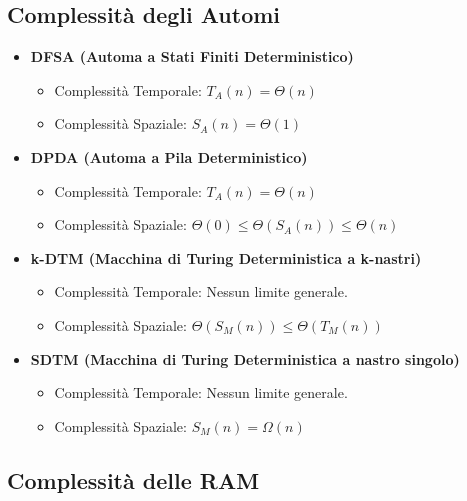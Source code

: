 \subsection*{Complessità degli Automi}
\begin{itemize}
    \item \textbf{DFSA (Automa a Stati Finiti Deterministico)}
    \begin{itemize}
        \item Complessità Temporale: $T_A(n) = \Theta(n)$
        \item Complessità Spaziale: $S_A(n) = \Theta(1)$
    \end{itemize}

    \item \textbf{DPDA (Automa a Pila Deterministico)}
    \begin{itemize}
        \item Complessità Temporale: $T_A(n) = \Theta(n)$
        \item Complessità Spaziale: $\Theta(0) \le \Theta(S_A(n)) \le \Theta(n)$
    \end{itemize}

    \item \textbf{k-DTM (Macchina di Turing Deterministica a k-nastri)}
    \begin{itemize}
        \item Complessità Temporale: Nessun limite generale.
        \item Complessità Spaziale: $\Theta(S_M(n)) \le \Theta(T_M(n))$
    \end{itemize}

    \item \textbf{SDTM (Macchina di Turing Deterministica a nastro singolo)}
    \begin{itemize}
        \item Complessità Temporale: Nessun limite generale.
        \item Complessità Spaziale: $S_M(n) = \Omega(n)$
    \end{itemize}
\end{itemize}

\subsection*{Complessità delle RAM}

